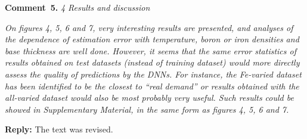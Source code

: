\documentclass[num-refs]{wiley-article} %
\begin{document}
\textcolor[rgb]{0.00,0.50,1.00}{\textbf{Comment~5.}}
\emph{4 Results and discussion}

\emph{
On figures 4, 5, 6 and 7, very interesting results are presented, and analyses of the dependence of estimation 
error with temperature, boron or iron densities and base thickness are well done. 
However, it seems that the same error statistics of results obtained on test datasets 
(instead of training dataset) would more directly assess the quality of predictions by the DNNs. 
For instance, the Fe-varied dataset has been identified to be 
the closest to “real demand” or results obtained with the all-varied dataset would also be most probably very useful. 
Such results could be showed in Supplementary Material, in the same form as figures 4, 5, 6 and 7. }


\noindent
\textcolor[rgb]{0.51,0.00,0.00}{\textbf{Reply:}}
The text was revised.
\end{document}
